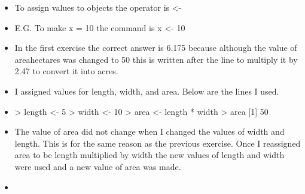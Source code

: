 \documentclass{article}
\begin{document}
\begin{itemize}
    \item To assign values to objects the operator is <-
    \item E.G. To make x = 10 the command is x <- 10
    \item In the first exercise the correct answer is 6.175 because although the value of area\textunderscore hectares was changed to 50 this is written after the line to multiply it by 2.47 to convert it into acres.
    \item I assigned values for length, width, and area. Below are the lines I used.
    \item > length <- 5
> width <- 10
> area <- length * width
> area
[1] 50
\item The value of area did not change when I changed the values of width and length. This is for the same reason as the previous exercise. Once I reassigned area to be length multiplied by width the new values of length and width were used and a new value of area was made.
\item 
\end{itemize}
\end{document}

